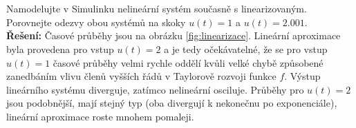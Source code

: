 \documentclass[twoside]{article}
\begin{document}
\subsection{~}
Namodelujte v Simulinku nelineární systém současně s linearizovaným. Porovnejte odezvy obou systémů
na skoky $u(t) = 1$ a $u(t) = 2.001$. \\
\textbf{Řešení:} Časové průběhy jsou na obrázku \ref{fig:linearizace}. Lineární aproximace byla provedena pro vstup $u(t) = 2$ a je tedy očekávatelné, že se pro vstup $u(t) = 1$
časové průběhy velmi rychle oddělí kvůli velké chybě způsobené zanedbáním vlivu členů vyšších řádů v Taylorově rozvoji funkce $f$.
Výstup lineárního systému diverguje, zatímco nelineární osciluje. Průběhy pro $u(t) = 2$ jsou podobnější, mají stejný typ (oba divergují k nekonečnu po exponenciále),
lineární aproximace roste mnohem pomaleji.
\end{document}
